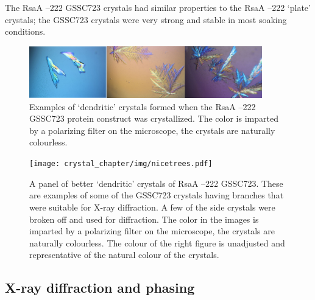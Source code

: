 The RsaA --222 GSSC723 crystals had similar properties to the RsaA --222 `plate' crystals; the GSSC723 crystals were very strong and stable in most soaking conditions.

\begin{figure}[htb]
  	\begin{center}
   		\includegraphics[width=0.9\textwidth]{crystal_chapter/img/dendroXtals.jpg}
   	\end{center}
   	\caption[Examples of unusable `dendritic' RsaA --222 GSSC723 crystals]{Examples of `dendritic' crystals formed when the RsaA --222 GSSC723 protein construct was crystallized. The color is imparted by a polarizing filter on the microscope, the crystals are naturally colourless.}
   	\label{fig:crystal-dendrites}
\end{figure}

\begin{figure}[htb]
  	\begin{center}
   		\texttt{[image: crystal\_chapter/img/nicetrees.pdf]}
   	\end{center}
   	\caption[`Dendritic' RsaA --222 GSSC723 crystals that were used for X-ray diffraction]{A panel of better `dendritic' crystals of RsaA --222 GSSC723. These are examples of some of the GSSC723 crystals having branches that were suitable for X-ray diffraction. A few of the side crystals were broken off and used for diffraction.  The color in the images is imparted by a polarizing filter on the microscope, the crystals are naturally colourless. The colour of the right figure is unadjusted and representative of the natural colour of the crystals.}
   	\label{fig:nice-trees}
\end{figure}   

\subsection{X-ray diffraction and phasing}\label{sec:x-ray-diffraction}


